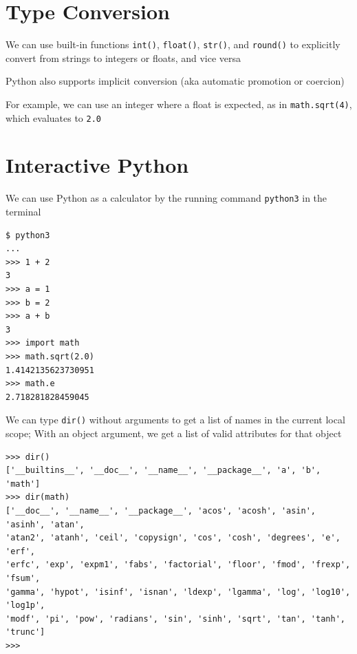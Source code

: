 \documentclass[8pt,a4paper,compress]{beamer}
\begin{document}
\section{Type Conversion}
\begin{frame}[fragile]
\pause

We can use built-in functions \lstinline{int()}, \lstinline{float()}, \lstinline{str()}, and \lstinline{round()} to explicitly convert from strings to integers or floats, and vice versa

\pause
\bigskip

Python also supports implicit conversion (aka automatic promotion or coercion)

\pause
\bigskip

For example, we can use an integer where a float is expected, as in \lstinline{math.sqrt(4)}, which evaluates to \lstinline{2.0}
\end{frame}

\section{Interactive Python}
\begin{frame}[fragile]
\pause

We can use Python as a calculator by the running command \lstinline{python3} in the terminal

\begin{lstlisting}[language={}]
$ python3
...
>>> 1 + 2
3
>>> a = 1
>>> b = 2
>>> a + b
3
>>> import math
>>> math.sqrt(2.0)
1.4142135623730951
>>> math.e
2.718281828459045
\end{lstlisting}

\pause
\bigskip

We can type \lstinline{dir()} without arguments to get a list of names in the current local scope; With an object argument, we get a list of valid attributes for that object
\begin{lstlisting}[language={}]
>>> dir()
['__builtins__', '__doc__', '__name__', '__package__', 'a', 'b', 'math']
>>> dir(math)
['__doc__', '__name__', '__package__', 'acos', 'acosh', 'asin', 'asinh', 'atan', 
'atan2', 'atanh', 'ceil', 'copysign', 'cos', 'cosh', 'degrees', 'e', 'erf', 
'erfc', 'exp', 'expm1', 'fabs', 'factorial', 'floor', 'fmod', 'frexp', 'fsum', 
'gamma', 'hypot', 'isinf', 'isnan', 'ldexp', 'lgamma', 'log', 'log10', 'log1p', 
'modf', 'pi', 'pow', 'radians', 'sin', 'sinh', 'sqrt', 'tan', 'tanh', 'trunc']
>>> 
\end{lstlisting}
\end{frame}
\end{document}
